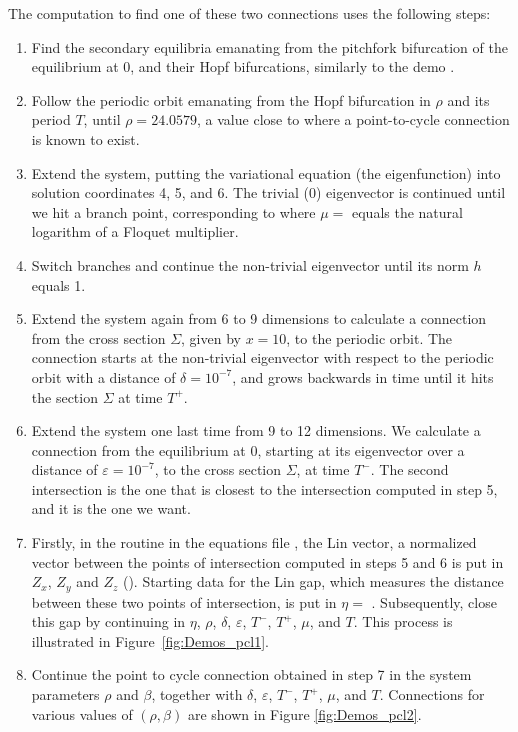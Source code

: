 \documentclass[12pt]{report}
\begin{document}
The computation to find one of these two connections uses the following steps:
\begin{enumerate}
\item
Find the secondary equilibria emanating from the pitchfork
bifurcation of the equilibrium at $0$, and their Hopf bifurcations,
similarly to the demo .
\item
Follow the periodic orbit emanating from the Hopf bifurcation in
$\rho$ and its period $T$, until
$\rho=24.0579$, a value close to where a point-to-cycle connection is
known to exist.
\item
Extend the system, putting the variational equation (the eigenfunction)
into solution coordinates 4, 5, and 6. The trivial (0) eigenvector is
continued until we hit a branch point, corresponding to
where $\mu=$  equals the natural logarithm of a Floquet
multiplier.
\item
Switch branches and continue the non-trivial eigenvector until its
norm $h$ equals 1.
\item
Extend the system again from 6 to 9 dimensions
to calculate a connection from the cross section $\Sigma$, given by
$x=10$, to the periodic orbit.
The connection starts at the non-trivial eigenvector with respect
to the periodic orbit with a distance of $\delta=10^{-7}$,
and grows backwards in time
until it hits the section $\Sigma$ at time $T^+$.
\item
Extend the system one last time from 9 to 12 dimensions.
We calculate a connection from the equilibrium at 0, starting at
its eigenvector over a distance of $\varepsilon=10^{-7}$,
to the cross section
$\Sigma$, at time $T^-$.
The second intersection is the one that is closest to the
intersection computed in step 5, and it is the one we want.
\item
Firstly, in the routine  in the equations file ,
the Lin vector, a normalized vector between the points of intersection
computed in steps 5 and 6 is put in $Z_x$, $Z_y$ and $Z_z$
  ().
Starting data for the Lin gap, which measures the distance between
these two points of intersection, is put in $\eta=$ .
Subsequently, close this gap by continuing in 
$\eta$, $\rho$, $\delta$, $\varepsilon$, $T^-$, $T^+$, $\mu$, and $T$.
This process is illustrated in Figure~\ref{fig:Demos_pcl1}.
\item
Continue the point to cycle connection obtained in step 7
in the system parameters $\rho$ and $\beta$, together with
$\delta$, $\varepsilon$, $T^-$, $T^+$, $\mu$, and $T$.
Connections for various
values of $(\rho,\beta)$ are shown in Figure \ref{fig:Demos_pcl2}.
\end{enumerate}
\end{document}
